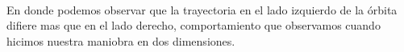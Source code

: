 \documentclass[11pt]{article}
\makeatletter
\newcommand{\boxspacing}{\kern\kvtcb@left@rule\kern\kvtcb@boxsep}
\newcommand{\prompt}[4]{
        \ttfamily\llap{{\color{#2}[#3]:\hspace{3pt}#4}}\vspace{-\baselineskip}
    }
\makeatother
\begin{document}
    \begin{center}
    \end{center}
    { \hspace*{\fill} \\}
    
    En donde podemos observar que la trayectoria en el lado izquierdo de la
órbita difiere mas que en el lado derecho, comportamiento que observamos
cuando hicimos nuestra maniobra en dos dimensiones.

    

    \begin{tcolorbox}[breakable, size=fbox, boxrule=1pt, pad at break*=1mm,colback=cellbackground, colframe=cellborder]
\prompt{In}{incolor}{ }{\boxspacing}
\begin{Verbatim}[commandchars=\\\{\}]

\end{Verbatim}
\end{tcolorbox}


    
    
    
\end{document}
